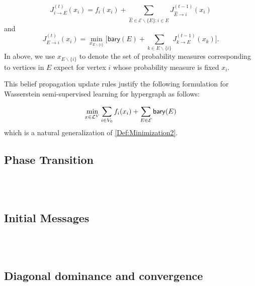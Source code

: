 $$J^{(t)}_{i\to E} (x_i) = f_i(x_i) + \sum_{\hat E\in \mathcal E\backslash\{E\}: i\in \hat E}J^{(t-1)}_{\hat E\to i}(x_i)$$
and 
\begin{equation}\label{Eq:Update}
    J^{(t)}_{E\to i}(x_i) =  \min_{x_{E\backslash \{i\}}}\Big[\mathsf{bary}(E) + \sum_{k\in E\backslash \{i\}}J^{(t-1)}_{k\to E}(x_k)\Big].
\end{equation}
In above, we use $x_{E\backslash \{i\}}$ to denote the set of probability measures corresponding to vertices in $E$ expect for vertex $i$ whose probability measure is fixed $x_i$.

This belief propagation update rules justify the following formulation for Wasserstein semi-supervised learning for hypergraph as follows:

$$\min_{x\in {\mathcal L}^V} \sum_{i\in V_0} f_i(x_i) + \sum_{E\in \mathcal E} \mathsf{bary}(E)$$
which is a natural generalization of \eqref{Def:Minimization2}.

\subsection{Phase Transition}

~\\
~\\

\subsection{Initial Messages}
~\\
~\\

\subsection{Diagonal dominance and convergence}
~\\
~\\


	


